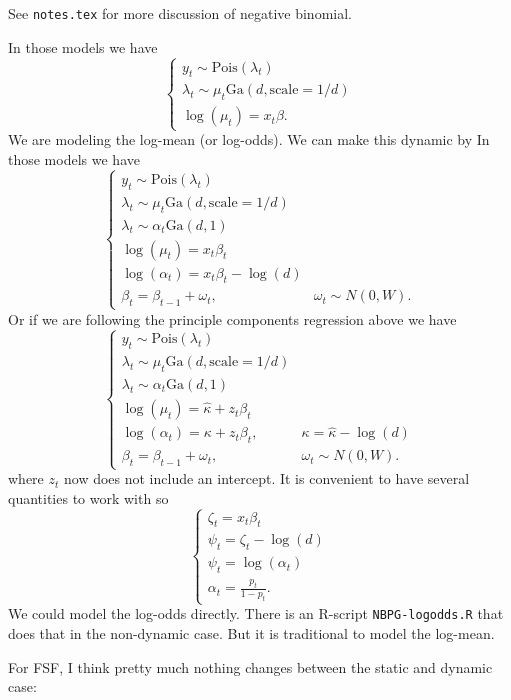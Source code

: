 \documentclass{article}
\newcommand{\Pois}{\text{Pois}}
\newcommand{\Ga}{\text{Ga}}
\begin{document}
See \texttt{notes.tex} for more discussion of negative binomial.

In those models we have
\[
\begin{cases}
y_t \sim \Pois(\lambda_t) \\
\lambda_t \sim \mu_t \Ga(d, \text{scale}=1/d) \\
\log(\mu_t) = x_t \beta.
\end{cases}
\]
We are modeling the log-mean (or log-odds).  We can make this dynamic by In
those models we have
\[
\begin{cases}
y_t \sim \Pois(\lambda_t) \\
\lambda_t \sim \mu_t \Ga(d, \text{scale}=1/d) \\
\lambda_t \sim \alpha_t \Ga(d, 1) \\
\log(\mu_t) = x_t \beta_t \\
\log(\alpha_t) = x_t \beta_t - \log(d) \\
\beta_t = \beta_{t-1} + \omega_t, & \omega_t \sim N(0, W).
\end{cases}
\]
Or if we are following the principle components regression above we have
\[
\begin{cases}
y_t \sim \Pois(\lambda_t) \\
\lambda_t \sim \mu_t \Ga(d, \text{scale}=1/d) \\
\lambda_t \sim \alpha_t \Ga(d, 1) \\
\log(\mu_t) = \hat \kappa + z_t \beta_t \\
\log(\alpha_t) = \kappa + z_t \beta_t, & \kappa = \hat \kappa - \log(d) \\
\beta_t = \beta_{t-1} + \omega_t, & \omega_t \sim N(0, W).
\end{cases}
\]
where $z_t$ now does not include an intercept.  It is convenient to have several
quantities to work with so 
\[
\begin{cases}
\zeta_t = x_t \beta_t \\
\psi_t = \zeta_t - \log(d) \\
\psi_t = \log(\alpha_t) \\
\alpha_t = \frac{p_t}{1-p_t}.
\end{cases}
\]
We could model the log-odds directly.  There is an R-script
\texttt{NBPG-logodds.R} that does that in the non-dynamic case.  But it is
traditional to model the log-mean.

For FSF, I think pretty much nothing changes between the static and dynamic
case:
\end{document}
